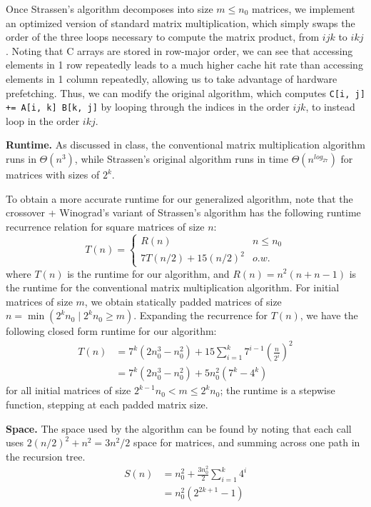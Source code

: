 \documentclass[a4paper]{article}
\begin{document}
Once Strassen's algorithm decomposes into size $m\leq n_0$ matrices, we implement an optimized version of standard matrix multiplication, which simply swaps the order of the three loops necessary to compute the matrix product, from $ijk$ to $ikj$. Noting that C arrays are stored in row-major order, we can see that accessing elements in 1 row repeatedly leads to a much higher cache hit rate than accessing elements in 1 column repeatedly, allowing us to take advantage of hardware prefetching. Thus, we can modify the original algorithm, which computes \texttt{C[i, j] += A[i, k] B[k, j]} by looping through the indices in the order $ijk$, to instead loop in the order $ikj$.

\textbf{Runtime.} As discussed in class, the conventional matrix multiplication algorithm runs in $\Theta(n^3)$, while Strassen's original algorithm runs in time $\Theta(n^{log_27})$ for matrices with sizes of $2^k$.

To obtain a more accurate runtime for our generalized algorithm, note that the crossover + Winograd's variant of Strassen's algorithm has the following runtime recurrence relation for square matrices of size $n$:
\[ 
T(n) = 
\begin{cases} 
R(n) & n\leq n_0 \\
7T(n/2) + 15(n/2)^2 & o.w.
\end{cases}
\]
where $T(n)$ is the runtime for our algorithm, and $R(n) = n^2(n + n-1)$ is the runtime for the conventional matrix multiplication algorithm. For initial matrices of size $m$, we obtain statically padded matrices of size $n = \min(2^kn_0\mid2^kn_0\geq m)$. Expanding the recurrence for $T(n)$, we have the following closed form runtime for our algorithm:
\begin{align*}
T(n) &= 7^k(2n_0^3 - n_0^2) + 15\sum_{i=1}^k 7^{i-1}\left(\frac{n}{2^i}\right)^2 \\
&= 7^k(2n_0^3 - n_0^2) + 5 n_0^2(7^k - 4^k)
\end{align*}
for all initial matrices of size $2^{k-1}n_0 < m \leq 2^k n_0$; the runtime is a stepwise function, stepping at each padded matrix size.

\textbf{Space. } The space used by the algorithm can be found by noting that each call uses $2(n/2)^2 + n^2 = 3n^2/2$ space for matrices, and summing across one path in the recursion tree.
\begin{align*}
S(n) &= n_0^2 + \frac{3n_0^2}{2}\sum_{i=1}^k 4^i \\
&= n_0^2(2^{2k+1} - 1)
\end{align*}
\end{document}
